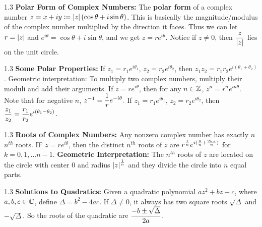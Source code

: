 \documentclass{article}
\newcommand{\framethis}[2][1.3]{
  \begin{framed}
    \begin{spacing}{#1}
      #2
    \end{spacing}
  \end{framed}
}
\begin{document}
  \framethis{\textbf{Polar Form of Complex Numbers:}\el
  The \textbf{polar form} of a complex number $z = x+iy \coloneqq \left|z\right| (\cos\theta + i \sin\theta)$.
  This is basically the magnitude/modulus of the complex number multiplied by the direction it faces.
  Thus we can let $r = \left|z\right|$ and $e^{i\theta} = \cos\theta + i\sin\theta$, and we get
  $z = re^{i\theta}$. Notice if $z \neq 0$, then $\displaystyle \frac{z}{\left|z\right|}$ lies on the unit circle.
  }


  \framethis{\textbf{Some Polar Properties:}\el
    If $z_1 = r_1e^{i\theta_1}$, $z_2 = r_2e^{i\theta_2}$, then $z_1z_2=r_1r_2e^{i(\theta_1+\theta_2)}$.
    Geometric interpretation: To multiply two complex numbers, multiply their moduli and add their arguments.\el
    If $z = re^{i\theta}$, then for any $n \in {\mathbb Z}$, $z^n=r^n e^{in\theta}$. Note that for negative $n$, $z^{-1} = 
    \displaystyle \frac{1}{r}e^{-i\theta}.$\el
    If $z_1 = r_1e^{i\theta_1}$, $z_2 = r_2e^{i\theta_2}$, then $\displaystyle\frac{z_1}{z_2}
    = \frac{r_1}{r_2}e^{i(\theta_1 - \theta_2)}$.   
  }


  \framethis{\textbf{Roots of Complex Numbers:} Any nonzero complex number has exactly
  $n$ $n^{th}$ roots.\el
  IF $z = re^{i\theta}$, then the distinct $n^{th}$ roots of $z$ are 
  $\displaystyle r^{\frac{1}{n}}e^{i(\frac{\theta}{n} + \frac{2k\pi}{n})}$ for 
  $k = 0,1, \ldots n-1$.\el
  \textbf{Geometric Interpretation:} The $n^{th}$ roots of $z$ are located on the
  circle with center 0 and radius $\left|z\right|^{\frac{1}{n}}$ and they divide the circle
  into $n$ equal parts.}

  \framethis{\textbf{Solutions to Quadratics:} Given a quadratic polynomial 
  $az^2+bz+c$, where $a,b,c \in {\mathbb C}$, define $\Delta = b^2-4ac$. If $\Delta \neq 0$,
  it always has two square roots $\sqrt{\Delta}$ and $-\sqrt{\Delta}$. So the roots
  of the quadratic are $\displaystyle \frac{-b\pm \sqrt{\Delta}}{2a}$.}
\end{document}

